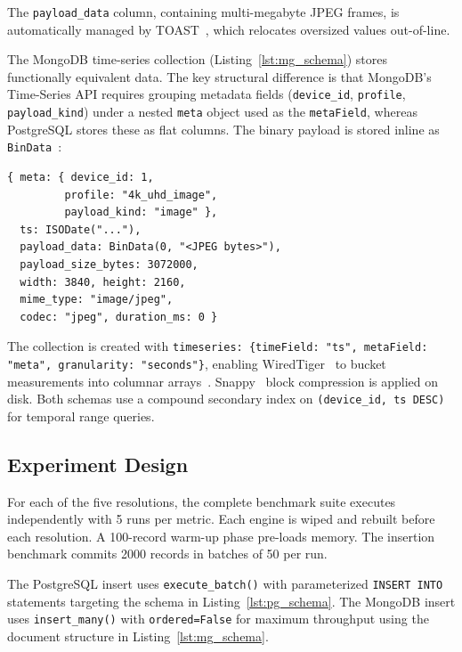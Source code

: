\documentclass[conference, a4paper]{IEEEtran}
\begin{document}
The \texttt{payload\_data} column, containing multi-megabyte JPEG frames, is automatically managed by TOAST~\cite{postgresql_toast_docs}, which relocates oversized values out-of-line.

The MongoDB time-series collection (Listing~\ref{lst:mg_schema}) stores functionally equivalent data. The key structural difference is that MongoDB's Time-Series API requires grouping metadata fields (\texttt{device\_id}, \texttt{profile}, \texttt{payload\_kind}) under a nested \texttt{meta} object used as the \texttt{metaField}, whereas PostgreSQL stores these as flat columns. The binary payload is stored inline as \texttt{BinData}~\cite{mongodb_bson_spec}:

\begin{lstlisting}[basicstyle=\ttfamily\scriptsize,breaklines=true,caption={MongoDB document structure (per insert).},label={lst:mg_schema}]
{ meta: { device_id: 1,
         profile: "4k_uhd_image",
         payload_kind: "image" },
  ts: ISODate("..."),
  payload_data: BinData(0, "<JPEG bytes>"),
  payload_size_bytes: 3072000,
  width: 3840, height: 2160,
  mime_type: "image/jpeg",
  codec: "jpeg", duration_ms: 0 }
\end{lstlisting}

The collection is created with \texttt{timeseries: \{timeField: "ts", metaField: "meta", granularity: "seconds"\}}, enabling WiredTiger~\cite{mongodb_wiredtiger_storage} to bucket measurements into columnar arrays~\cite{mongodb_ts_best_practices}. Snappy~\cite{google_snappy} block compression is applied on disk. Both schemas use a compound secondary index on \texttt{(device\_id, ts DESC)} for temporal range queries.

\subsection{Experiment Design}
For each of the five resolutions, the complete benchmark suite executes independently with 5 runs per metric. Each engine is wiped and rebuilt before each resolution. A 100-record warm-up phase pre-loads memory. The insertion benchmark commits 2000 records in batches of 50 per run.

The PostgreSQL insert uses \texttt{execute\_batch()} with parameterized \texttt{INSERT INTO} statements targeting the schema in Listing~\ref{lst:pg_schema}. The MongoDB insert uses \texttt{insert\_many()} with \texttt{ordered=False} for maximum throughput using the document structure in Listing~\ref{lst:mg_schema}.
\end{document}
